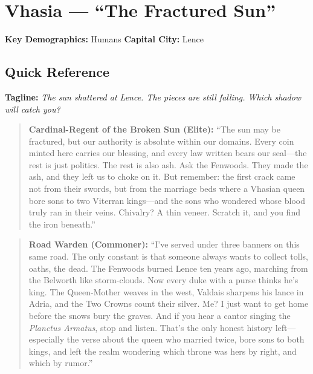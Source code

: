 \section{Vhasia --- ``The Fractured Sun''}
\label{chap:vhasia}

\textbf{Key Demographics: } Humans
\textbf{Capital City: } Lence

\subsection*{Quick Reference}
\textbf{Tagline:} \textit{The sun shattered at Lence. The pieces are still falling. Which shadow will catch you?}

\begin{quote}
  \textbf{Cardinal-Regent of the Broken Sun (Elite):}  
  ``The sun may be fractured, but our authority is absolute within our domains. Every coin minted here carries our blessing, and every law written bears our seal---the rest is just politics. The rest is also ash. Ask the Fenwoods. They made the ash, and they left us to choke on it. But remember: the first crack came not from their swords, but from the marriage beds where a Vhasian queen bore sons to two Viterran kings---and the sons who wondered whose blood truly ran in their veins. Chivalry? A thin veneer. Scratch it, and you find the iron beneath.''
\end{quote}

\begin{quote}
  \textbf{Road Warden (Commoner):}  
  ``I've served under three banners on this same road. The only constant is that someone always wants to collect tolls, oaths, the dead. The Fenwoods burned Lence ten years ago, marching from the Belworth like storm-clouds. Now every duke with a purse thinks he's king. The Queen-Mother weaves in the west, Valdais sharpens his lance in Adria, and the Two Crowns count their silver. Me? I just want to get home before the snows bury the graves. And if you hear a cantor singing the \textit{Planctus Armatus}, stop and listen. That's the only honest history left---especially the verse about the queen who married twice, bore sons to both kings, and left the realm wondering which throne was hers by right, and which by rumor.''
\end{quote}

